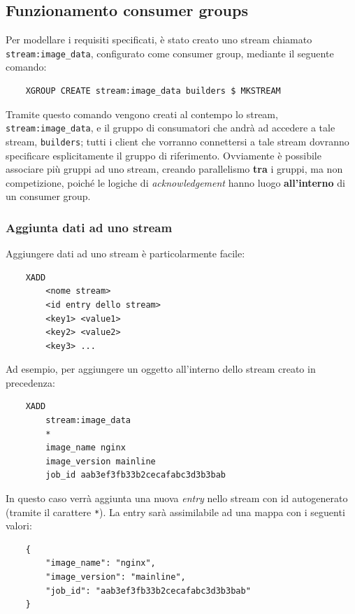 \subsection{Funzionamento consumer groups}
Per modellare i requisiti specificati, è stato creato uno stream chiamato \verb|stream:image_data|, configurato come consumer group, mediante il seguente comando:
\begin{verbatim}
    XGROUP CREATE stream:image_data builders $ MKSTREAM
\end{verbatim}
Tramite questo comando vengono creati al contempo lo stream, \verb|stream:image_data|, e il gruppo di consumatori che andrà ad accedere a tale stream, \verb|builders|; tutti i client che vorranno connettersi a tale stream dovranno specificare esplicitamente il gruppo di riferimento. Ovviamente è possibile associare più gruppi ad uno stream, creando parallelismo \textbf{tra} i gruppi, ma non competizione, poiché le logiche di \textit{acknowledgement} hanno luogo \textbf{all'interno} di un consumer group.
\newline
\subsubsection{Aggiunta dati ad uno stream}
Aggiungere dati ad uno stream è particolarmente facile:
\begin{verbatim}
    XADD 
        <nome stream> 
        <id entry dello stream> 
        <key1> <value1> 
        <key2> <value2> 
        <key3> ...
\end{verbatim}
Ad esempio, per aggiungere un oggetto all'interno dello stream creato in precedenza: 
\begin{verbatim}
    XADD 
        stream:image_data 
        * 
        image_name nginx 
        image_version mainline 
        job_id aab3ef3fb33b2cecafabc3d3b3bab
\end{verbatim}
In questo caso verrà aggiunta una nuova \textit{entry} nello stream con id autogenerato (tramite il carattere \verb|*|). La entry sarà assimilabile ad una mappa con i seguenti valori:
\begin{verbatim}
    {
        "image_name": "nginx",
        "image_version": "mainline",
        "job_id": "aab3ef3fb33b2cecafabc3d3b3bab"
    }
\end{verbatim}
